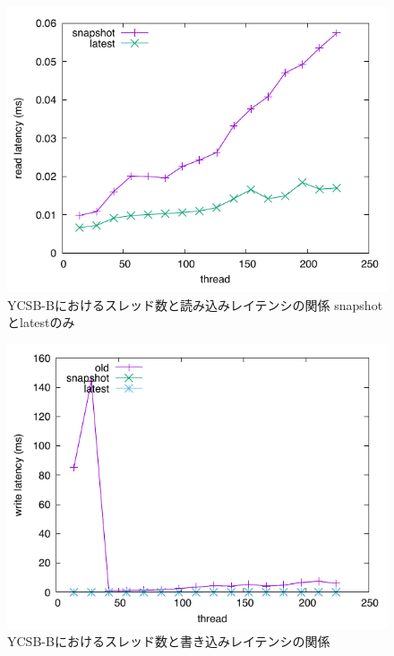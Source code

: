 \documentclass[a4paper]{jreport}	%
\begin{document}
\begin{figure}[h] 
\centering
\includegraphics[width=15cm]{ycsb-b/opposite-read-latency2}
\caption{YCSB-Bにおけるスレッド数と読み込みレイテンシの関係 snapshotとlatestのみ}
\label{fig:b-read-latency2}
\end{figure}


\begin{figure}[h] 
\centering
\includegraphics[width=15cm]{ycsb-b/opposite-write-latency}
\caption{YCSB-Bにおけるスレッド数と書き込みレイテンシの関係}
\label{fig:b-write-latency}
\end{figure}
\end{document}
